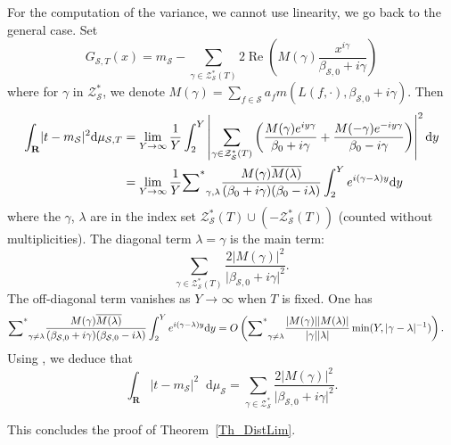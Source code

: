 \documentclass[a4paper,10pt]{amsart}
\theoremstyle{plain}
\theoremstyle{definition}
\begin{document}
For the computation of the variance, we cannot use linearity, we go back to the general case.
Set 
$$G_{\mathcal{S},T}(x) = m_{\mathcal{S}} - \sum_{\gamma\in \mathcal{Z}^{*}_{\mathcal{S}}(T)} 2\operatorname{Re}\left(M(\gamma)\frac{x^{i\gamma}}{\beta_{\mathcal{S},0} + i\gamma}\right)$$
where for $\gamma$ in $\mathcal{Z}_{\mathcal{S}}^{*}$, we denote $M(\gamma) = \sum_{f\in\mathcal{S}}a_{f} m(L(f,\cdot),\beta_{\mathcal{S},0} + i\gamma)$.
Then
\begin{align*}
\int_{\mathbf{R}}\lvert t - m_{\mathcal{S}}\rvert^{2}{\mathop{}\!\mathrm{d}}\mu_{\mathcal{S},T}
&= \lim_{Y\rightarrow\infty} \frac{1}{Y}\int_{2}^{Y} \left\lvert\sum_{\gamma\in \mathcal{Z}^{*}_{\mathcal{S}}(T)} \left(\frac{M(\gamma)e^{iy\gamma}}{\beta_{0} + i\gamma} + \frac{M(-\gamma)e^{-iy\gamma}}{\beta_{0} - i\gamma}\right)\right\rvert^{2} {\mathop{}\!\mathrm{d}} y \\
&= \lim_{Y\rightarrow\infty} \frac{1}{Y}{\mathop{\sum \Bigl.^{*}}\limits}_{\gamma,\lambda}\frac{M(\gamma)\overline{M(\lambda)}}{(\beta_{0} + i\gamma)(\beta_{0} - i\lambda)}\int_{2}^{Y}e^{i(\gamma-\lambda)y}{\mathop{}\!\mathrm{d}} y
\end{align*}
where the $\gamma$, $\lambda$ are in the index set $\mathcal{Z}_{\mathcal{S}}^{*}(T)\cup (- \mathcal{Z}_{\mathcal{S}}^{*}(T))$ (counted without multiplicities).
The diagonal term $\lambda=\gamma$ is the main term: 
$$\sum_{\gamma\in\mathcal{Z}^{*}_{\mathcal{S}}(T)}
\frac{2\lvert M(\gamma)\rvert^{2}}{\lvert \beta_{\mathcal{S},0} + i\gamma \rvert^{2}}.$$
The off-diagonal term vanishes as $Y\rightarrow\infty$ when $T$ is fixed.
One has 
\begin{align*}
{\mathop{\sum \Bigl.^{*}}\limits}_{\gamma\neq\lambda}\frac{M(\gamma)\overline{M(\lambda)}}{(\beta_{\mathcal{S},0} + i\gamma)(\beta_{\mathcal{S},0} - i\lambda)}\int_{2}^{Y}e^{i(\gamma-\lambda)y}{\mathop{}\!\mathrm{d}} y
&= O\left(  {\mathop{\sum \Bigl.^{*}}\limits}_{\gamma\neq\lambda}\frac{\lvert M(\gamma)\rvert\lvert M(\lambda)\rvert}{\lvert\gamma\rvert\lvert\lambda\rvert}\min(Y,\lvert \gamma-\lambda\rvert^{-1}) \right).
\end{align*}
Using \cite[Lem. 2.6]{FioEC},
we deduce that
\begin{equation*}
\int_{\mathbf{R}}\lvert t - m_{\mathcal{S}}\rvert^{2}{\mathop{}\!\mathrm{d}}\mu_{\mathcal{S}} = 
\sum_{\gamma\in\mathcal{Z}^{*}_{\mathcal{S}}}
\frac{2\lvert M(\gamma)\rvert^{2}}{\lvert \beta_{\mathcal{S},0} + i\gamma \rvert^{2}}.
\end{equation*}

This concludes the proof of Theorem~\ref{Th_DistLim}.
 
\end{document}
